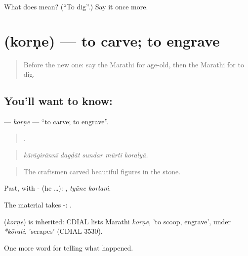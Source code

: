 \begin{tcolorbox}[breakable,colback=teal!4,colframe=teal!35!black,title={Before you move on}]
What does  mean? (\textquotedblleft{}To dig\textquotedblright{}.) Say it once more.
\end{tcolorbox}
\section[\texorpdfstring{\mr{कोरणे} (korṇe)}{कोरणे (korṇe)}]{ (korṇe) — to carve; to engrave}

\label{lesson:MR-C335-korne}



\begin{quote}
Before the new one: say the Marathi for age-old, then the Marathi for to dig.
\end{quote}

\subsection*{You'll want to know: }
\textbf{} — \emph{korṇe} — \textquotedblleft{}to carve; to engrave\textquotedblright{}.

\begin{quote}
    .
\end{quote}

\begin{quote}
\emph{kārāgirānnī dagḍāt sundar mūrtī koralyā.}
\end{quote}

\begin{quote}
The craftsmen carved beautiful figures in the stone.
\end{quote}

Past, with - (he …):  , \emph{tyāne korlaṁ}.

The material takes -:  .

\begin{cousinweb}
\textbf{} (\emph{korṇe}) is inherited: CDIAL lists Marathi \emph{korṇe}, 'to scoop, engrave', under \emph{*kōrati}, 'scrapes' (CDIAL 3530).
\end{cousinweb}

\begin{grammarlens}[title={What you've built}]
One more word for telling what happened.
\end{grammarlens}

